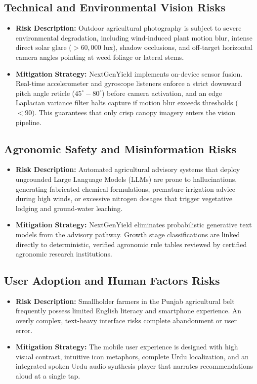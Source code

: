 \documentclass{FastFyp}
\begin{document}
\subsection{Technical and Environmental Vision Risks}
\begin{itemize}
    \item \textbf{Risk Description:} Outdoor agricultural photography is subject to severe environmental degradation, including wind-induced plant motion blur, intense direct solar glare ($> 60,000\text{ lux}$), shadow occlusions, and off-target horizontal camera angles pointing at weed foliage or lateral stems.
    \item \textbf{Mitigation Strategy:} NextGenYield implements on-device sensor fusion. Real-time accelerometer and gyroscope listeners enforce a strict downward pitch angle reticle ($45^\circ - 80^\circ$) before camera activation, and an edge Laplacian variance filter halts capture if motion blur exceeds thresholds ($< 90$). This guarantees that only crisp canopy imagery enters the vision pipeline.
\end{itemize}

\subsection{Agronomic Safety and Misinformation Risks}
\begin{itemize}
    \item \textbf{Risk Description:} Automated agricultural advisory systems that deploy ungrounded Large Language Models (LLMs) are prone to hallucinations, generating fabricated chemical formulations, premature irrigation advice during high winds, or excessive nitrogen dosages that trigger vegetative lodging and ground-water leaching.
    \item \textbf{Mitigation Strategy:} NextGenYield eliminates probabilistic generative text models from the advisory pathway. Growth stage classifications are linked directly to deterministic, verified agronomic rule tables reviewed by certified agronomic research institutions.
\end{itemize}

\subsection{User Adoption and Human Factors Risks}
\begin{itemize}
    \item \textbf{Risk Description:} Smallholder farmers in the Punjab agricultural belt frequently possess limited English literacy and smartphone experience. An overly complex, text-heavy interface risks complete abandonment or user error.
    \item \textbf{Mitigation Strategy:} The mobile user experience is designed with high visual contrast, intuitive icon metaphors, complete Urdu localization, and an integrated spoken Urdu audio synthesis player that narrates recommendations aloud at a single tap.
\end{itemize}
\end{document}
